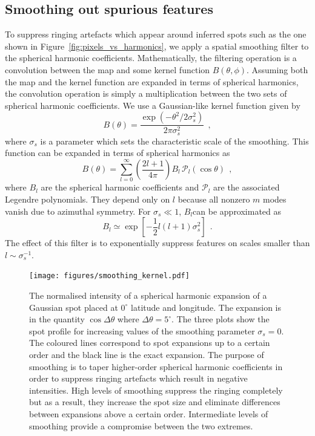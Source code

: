 \documentclass[12pt,dvipsnames]{report}
\newcommand{\hquad}{~~}
\begin{document}
\subsection{Smoothing out spurious features}
\label{ssec:spurious_features}
To suppress ringing artefacts which appear around inferred spots such as the one shown in Figure~\ref{fig:pixels_vs_harmonics}, we apply a spatial smoothing filter to the spherical harmonic coefficients.
Mathematically, the filtering operation is a convolution between the map and some kernel function $B(\theta,\phi)$.
Assuming both the map and the kernel function are expanded in terms of spherical harmonics, the convolution operation is simply a multiplication between the two sets of spherical harmonic coefficients.
We use a Gaussian-like kernel function given by
\begin{equation}
    B(\theta)=\frac{\exp \left(-\theta^{2} / 2 \sigma_s^{2}\right)}{2 \pi \sigma_s^{2}}
    \hquad,
\end{equation}
where $\sigma_s$ is a parameter which sets the characteristic scale of the smoothing.
This function can be expanded in terms of spherical harmonics as
\begin{equation}
    B(\theta)=\sum_{l=0}^{\infty}\left(\frac{2 l+1}{4 \pi}\right) B_{l} \,\mathcal{P}_{l}(\cos \theta)
    \hquad,
\end{equation}
where $B_l$ are the spherical harmonic coefficients and $\mathcal{P}_l$ are the associated Legendre polynomials.
They depend only on $l$ because all nonzero $m$ modes vanish due to azimuthal symmetry.
For $\sigma_s\ll 1$, $B_l$can be approximated as 
\citep{2007astro.ph..3168S,1995ApJ...443....6W}
\begin{equation}
    B_l\simeq \exp\left[-\frac{1}{2}l(l+1)\sigma_s^2\right]
    \hquad.
\end{equation}
The effect of this filter is to exponentially suppress features on scales smaller than $l\sim \sigma_s^{-1}$.


\begin{figure}[t!]
    \begin{centering}
    \texttt{[image: figures/smoothing\_kernel.pdf]}
    \caption{
       The normalised intensity of a spherical harmonic expansion of 
        a Gaussian spot placed at $0^\circ$ latitude and longitude.
        The expansion is in the quantity $\cos\Delta\theta$ where $\Delta\theta=5^\circ$.
        The three plots show the spot profile for increasing values of the smoothing parameter 
    $\sigma_s=0$. 
        The coloured lines correspond to spot expansions up to a certain order and the black line is the exact expansion.
        The purpose of smoothing is to taper higher-order spherical harmonic coefficients in order to suppress ringing artefacts which result in negative intensities.
        High levels of smoothing suppress the ringing completely but as a result, they increase the spot size and eliminate differences between expansions above a certain order.
        Intermediate levels of smoothing provide a compromise between the two extremes.
    }
    \label{fig:smoothing_kernel}
    \end{centering}
\end{figure}
\end{document}
